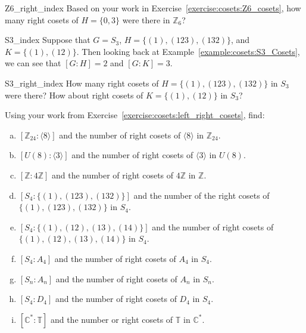 \begin{exercise}{Z6_right_index}
Based on your work in  Exercise~\ref{exercise:cosets:Z6_cosets}, how many right cosets of  $H = \{ 0, 3 \}$ were there in ${\mathbb Z}_6$?
\end{exercise}

\begin{example}{S3_index}
Suppose that $G= S_3$, $H = \{ (1),(123), (132) \}$, and $K= \{ (1), (12) \}$.  Then looking back at Example~\ref{example:cosets:S3_Cosets}, we can see that $[G:H] = 2$ and $[G:K] = 3$. 
\end{example}

\begin{exercise}{S3_right_index}
How many right cosets of  $H = \{ (1),(123), (132) \}$ in $S_3$ were there?  How about right cosets of  $K= \{ (1), (12) \}$ in $S_3$?
\end{exercise}

\begin{exercise}{}
Using your work from Exercise~\ref{exercise:cosets:left_right_cosets}, find:

\begin{enumerate}[(a)]
\item
$[ {\mathbb Z}_{24}: \langle 8 \rangle ]$ and the number of right cosets of $\langle 8 \rangle$ in ${\mathbb Z}_{24}$.

\item
$[ U(8) : \langle 3 \rangle ]$ and the number of right cosets of $\langle 3 \rangle$ in $U(8)$.

\item
$[{\mathbb Z} : 4{\mathbb Z} ]$ and the number of right cosets of $4{\mathbb Z}$ in ${\mathbb Z}$.

\item
$[  S_4 : \{ (1), (123), (132) \}  ]$ and the number of the right cosets of $\{ (1), (123), (132) \}$ in $S_4$.

\item
$[ S_4 : \{ (1), (12), (13), (14) \} ]$ and the number of right cosets of $\{ (1), (12), (13), (14) \}$ in $S_4$.

\item
$[ S_4 : A_4 ]$ and the number of right cosets of $A_4$ in $S_4$.

\item
$[ S_n : A_n ]$ and the number of right cosets of $A_n$ in $S_n$.

\item
$[S_4 : D_4  ]$ and the number of right cosets of $D_4$ in $S_4$.

\item
$[ {\mathbb C}^\ast : {\mathbb T} ]$ and the number or right cosets of ${\mathbb T}$ in ${\mathbb C}^\ast$.

\end{enumerate}
\end{exercise}

